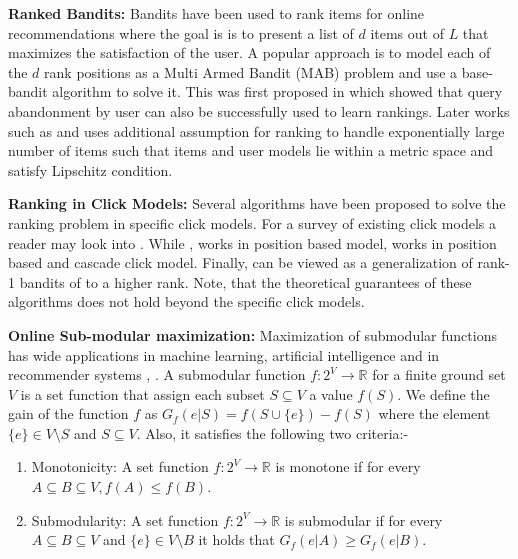 \textbf{Ranked Bandits:} Bandits have been used to rank items for online recommendations where the goal is is to present a list of $d$ items out of $L$ that maximizes the satisfaction of the user. A popular approach is to model each of the $d$ rank positions as a Multi Armed Bandit (MAB) problem and use a base-bandit algorithm to solve it. This was first proposed in \citet{radlinski2008learning} which  showed that query abandonment by user can also be successfully used to learn rankings. Later works such as \citet{slivkins2010ranked} and \citet{slivkins2013ranked} uses additional assumption for ranking to handle  exponentially large number of items such that  items and user models lie within a metric space and satisfy Lipschitz condition. 

\textbf{Ranking in Click Models:} Several algorithms have been proposed to solve the ranking problem in specific click models. For a survey of existing click models a reader may look into \citet{chuklin2015click}. While \citet{katariya2017bernoulli}, \citet{katariya2016stochastic} works in position based model, \citet{zoghi2017online} works in position based and cascade click model. Finally, \citet{kveton2017stochastic} 
can be viewed as a generalization of rank-1 bandits of \citet{katariya2016stochastic} to a higher rank. Note, that the theoretical guarantees of these algorithms does not hold beyond the specific click models.


\textbf{Online Sub-modular maximization:} Maximization of submodular functions has wide applications in machine learning, artificial
intelligence and in recommender systems \citep{nemhauser1978analysis}, \citep{krause2014submodular}. A submodular function $f : 2^V \rightarrow \mathbb{R}$ for a finite ground set $V$ is a set function that assign each
subset $S \subseteq V$ a value $f(S)$. We define the gain of the function $f$ as $G_f(e|S) = f(S \cup \lbrace e\rbrace) - f(S)$ where the element $\lbrace e\rbrace \in V\setminus S$ and $S \subseteq V$. Also, it satisfies the following two criteria:-
\begin{enumerate}
\item Monotonicity: A set function $f : 2^V \rightarrow \mathbb{R}$ is monotone if for every $A \subseteq B \subseteq V, f(A) \leq f(B)$.

\item Submodularity: A set function $f : 2^V \rightarrow \mathbb{R}$ is submodular if for every $A \subseteq B \subseteq V$ and $\lbrace e\rbrace \in V \setminus B$ it holds that $G_f(e | A) \geq G_f(e | B)$.
\end{enumerate}

